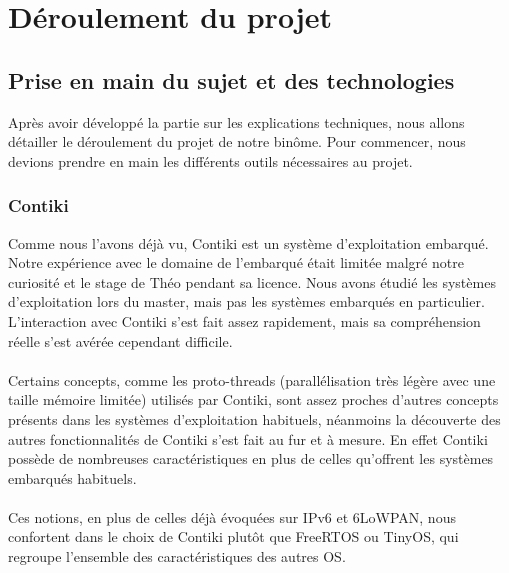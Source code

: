 \chapter{Déroulement du projet}
\label{sec:deroulement}

\section{Prise en main du sujet et des technologies}
	Après avoir développé la partie sur les explications techniques, nous allons détailler le déroulement du projet de notre binôme. Pour commencer, nous devions prendre en main les différents outils nécessaires au projet.
	
	\subsection{Contiki}
	Comme nous l'avons déjà vu, Contiki est un système d'exploitation  embarqué. Notre expérience avec le domaine de l'embarqué était limitée malgré notre curiosité et le stage de Théo pendant sa licence. Nous avons étudié les systèmes d'exploitation lors du master, mais pas les systèmes embarqués en particulier. L'interaction avec Contiki s'est fait assez rapidement, mais sa compréhension réelle s'est avérée cependant difficile.\\\\
	Certains concepts, comme les proto-threads (parallélisation très légère avec une taille mémoire limitée) utilisés par Contiki, sont assez proches d'autres concepts présents dans les systèmes d'exploitation habituels, néanmoins la découverte des autres fonctionnalités de Contiki s'est fait au fur et à mesure. En effet Contiki possède de nombreuses caractéristiques en plus de celles qu'offrent les systèmes embarqués habituels.\\\\
	Ces notions, en plus de celles déjà évoquées sur IPv6 et 6LoWPAN, nous confortent dans le choix de Contiki plutôt que FreeRTOS ou TinyOS, qui regroupe l'ensemble des caractéristiques des autres OS.

